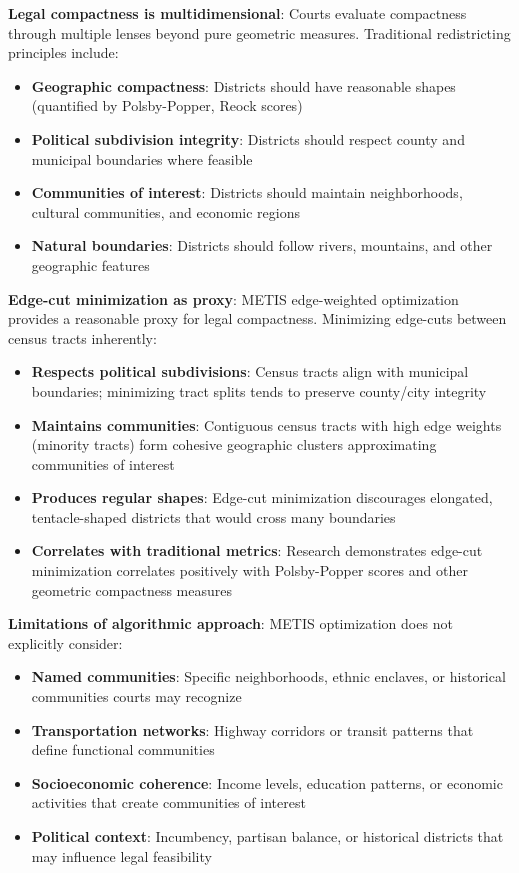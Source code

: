 \textbf{Legal compactness is multidimensional}: Courts evaluate compactness through multiple lenses beyond pure geometric measures. Traditional redistricting principles include:

\begin{itemize}
    \item \textbf{Geographic compactness}: Districts should have reasonable shapes (quantified by Polsby-Popper, Reock scores)
    \item \textbf{Political subdivision integrity}: Districts should respect county and municipal boundaries where feasible
    \item \textbf{Communities of interest}: Districts should maintain neighborhoods, cultural communities, and economic regions
    \item \textbf{Natural boundaries}: Districts should follow rivers, mountains, and other geographic features
\end{itemize}

\textbf{Edge-cut minimization as proxy}: METIS edge-weighted optimization provides a reasonable proxy for legal compactness. Minimizing edge-cuts between census tracts inherently:

\begin{itemize}
    \item \textbf{Respects political subdivisions}: Census tracts align with municipal boundaries; minimizing tract splits tends to preserve county/city integrity
    \item \textbf{Maintains communities}: Contiguous census tracts with high edge weights (minority tracts) form cohesive geographic clusters approximating communities of interest
    \item \textbf{Produces regular shapes}: Edge-cut minimization discourages elongated, tentacle-shaped districts that would cross many boundaries
    \item \textbf{Correlates with traditional metrics}: Research demonstrates edge-cut minimization correlates positively with Polsby-Popper scores and other geometric compactness measures
\end{itemize}

\textbf{Limitations of algorithmic approach}: METIS optimization does not explicitly consider:

\begin{itemize}
    \item \textbf{Named communities}: Specific neighborhoods, ethnic enclaves, or historical communities courts may recognize
    \item \textbf{Transportation networks}: Highway corridors or transit patterns that define functional communities
    \item \textbf{Socioeconomic coherence}: Income levels, education patterns, or economic activities that create communities of interest
    \item \textbf{Political context}: Incumbency, partisan balance, or historical districts that may influence legal feasibility
\end{itemize}

